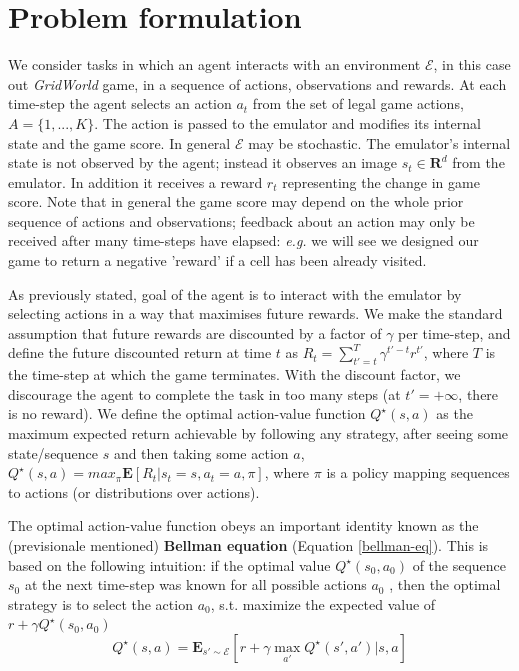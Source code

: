 \documentclass{article}
\begin{document}
\section{Problem formulation}

We consider tasks in which an agent interacts with an environment $\mathcal{E}$, in this case out \textit{GridWorld} game,
in a sequence of actions, observations and rewards. At each time-step the agent selects an action $a_{t}$ from the set of legal game actions, $A = \{1, . . . , K\}$. The action is passed to the emulator and
modifies its internal state and the game score. In general $\mathcal{E}$ may be stochastic. The emulator’s
internal state is not observed by the agent; instead it observes an image $s_t \in \mathbf{R}^d $ from the emulator. %
In addition it receives a reward $r_t$ representing the change in game score. Note that in general the game score may depend on the
whole prior sequence of actions and observations; feedback about an action may only be received
after many time-steps have elapsed: \textit{e.g.} we will see we designed our game to return a negative 'reward' if a cell has been already visited.  %

As previously stated, goal of the agent is to interact with the emulator by selecting actions in a way that maximises
future rewards. We make the standard assumption that future rewards are discounted by a factor of $\gamma$ per time-step, and define the future discounted return at time $t$ as $R_t = \sum_{t'=t}^{T}\gamma^{t'-t}r^{t'}$, where $T$
is the time-step at which the game terminates. With the discount factor, we discourage the agent to complete the task in too many steps (at $t'=+\infty$, there is no reward). We define the optimal action-value function $Q^\star(s, a)$ as the maximum expected return achievable by following any strategy, after seeing some state/sequence $s$ and then taking some action $a$, $Q^\star (s, a) = max_\pi \mathbf{E}[R_t |s_t = s, a_ t = a, \pi]$, where $\pi$ is a policy mapping sequences to actions (or distributions over actions).

The optimal action-value function obeys an important identity known as the (previsionale mentioned) \textbf{Bellman equation} (Equation \ref{bellman-eq}). This is based on the following intuition: if the optimal value $Q^\star (s_0 , a_0 )$ of the sequence $s_0$ at the next
time-step was known for all possible actions $a_0$ , then the optimal strategy is to select the action $a_0$, s.t. maximize the expected value of $r + \gamma Q^\star (s_0, a_0)$
\begin{equation}
\label{bellman-eq}
	Q^\star (s,a) = \mathbf{E}_{s' \sim \mathcal{E}} [ r + \gamma \max_{a'} Q^\star(s', a') | s, a  ]
\end{equation}
\end{document}
